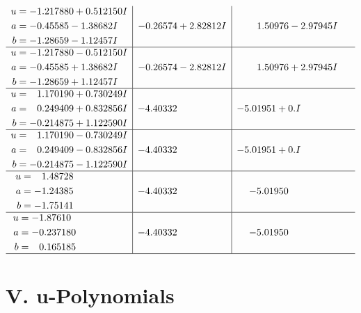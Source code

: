 \documentclass[1p]{elsarticle_modified}
\theoremstyle{definition}
\begin{document}
$$\begin{array}{c|c|c}
\begin{aligned}
u &= -1.217880 + 0.512150 I \\
a &= -0.45585 - 1.38682 I \\
b &= -1.28659 - 1.12457 I\end{aligned}
 & -0.26574 + 2.82812 I & \phantom{-}1.50976 - 2.97945 I \\ \hline\begin{aligned}
u &= -1.217880 - 0.512150 I \\
a &= -0.45585 + 1.38682 I \\
b &= -1.28659 + 1.12457 I\end{aligned}
 & -0.26574 - 2.82812 I & \phantom{-}1.50976 + 2.97945 I \\ \hline\begin{aligned}
u &= \phantom{-}1.170190 + 0.730249 I \\
a &= \phantom{-}0.249409 + 0.832856 I \\
b &= -0.214875 + 1.122590 I\end{aligned}
 & -4.40332\phantom{ +0.000000I} & -5.01951 + 0. I\phantom{ +0.000000I} \\ \hline\begin{aligned}
u &= \phantom{-}1.170190 - 0.730249 I \\
a &= \phantom{-}0.249409 - 0.832856 I \\
b &= -0.214875 - 1.122590 I\end{aligned}
 & -4.40332\phantom{ +0.000000I} & -5.01951 + 0. I\phantom{ +0.000000I} \\ \hline\begin{aligned}
u &= \phantom{-}1.48728\phantom{ +0.000000I} \\
a &= -1.24385\phantom{ +0.000000I} \\
b &= -1.75141\phantom{ +0.000000I}\end{aligned}
 & -4.40332\phantom{ +0.000000I} & -5.01950\phantom{ +0.000000I} \\ \hline\begin{aligned}
u &= -1.87610\phantom{ +0.000000I} \\
a &= -0.237180\phantom{ +0.000000I} \\
b &= \phantom{-}0.165185\phantom{ +0.000000I}\end{aligned}
 & -4.40332\phantom{ +0.000000I} & -5.01950\phantom{ +0.000000I}\\
 \hline 
 \end{array}$$\newpage
\newpage\renewcommand{\arraystretch}{1}
\centering \section*{ V. u-Polynomials}
\end{document}
